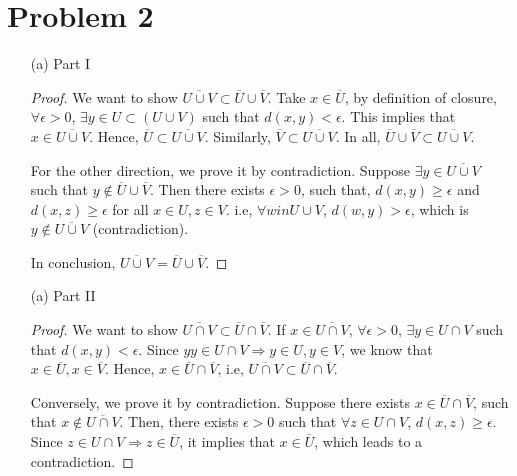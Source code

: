 \documentclass[12pt]{article}
\begin{document}
\section*{Problem 2}

\begin{enumerate}
\item [(a) Part I]

\begin{proof}

We want to show $\overline{U\cup V} \subset \overline U \cup \overline V$. Take $x \in \overline U$, by definition of closure, $\forall \epsilon >0$, $\exists y \in U\subset (U\cup V)$ such that  $d(x, y) < \epsilon$. This implies that $x \in \overline{U\cup V}$. Hence, $\overline U \subset \overline{U\cup V}$. Similarly, $\overline V \subset \overline{U\cup V}$. In all, $\overline U \cup \overline V \subset \overline{U\cup V}$.

For the other direction, we prove it by contradiction. Suppose $\exists y \in \overline{U \cup V}$ such that $y \notin \overline U \cup \overline V$. Then there exists $\epsilon > 0$, such that, $d(x, y) \geqslant \epsilon$ and $d(x, z) \geqslant \epsilon$ for all $x\in U, z \in V$. i.e, $\forall w in U\cup V$, $d(w, y) > \epsilon$, which is $y\notin \overline{U \cup V}$ (contradiction).

In conclusion, $\overline{U\cup V} = \overline U \cup \overline V$.

\end{proof}


\item [(a) Part II]

\begin{proof}

We want to show $\overline{U \cap V} \subset \overline U \cap \overline V$. If $x\in \overline{U\cap V}$, $\forall \epsilon > 0$, $\exists y \in U\cap V$ such that $d(x, y) < \epsilon$. Since $y y \in U\cap V \Rightarrow y \in U, y \in V$, we know that $x\in \overline U, x \in\overline V$. Hence, $x\in \overline U \cap \overline V$, i.e, $\overline{U \cap V} \subset \overline U \cap \overline V$.

Conversely, we prove it by contradiction. Suppose there exists $x \in \overline U \cap \overline V$, such that $x \notin \overline {U\cap V}$. Then, there exists $\epsilon > 0$ such that $\forall z \in U\cap V$, $d(x, z)\geqslant \epsilon$. Since $z\in U\cap V \Rightarrow z\in \overline U$, it implies that $x\in \overline U$, which leads to a contradiction.


\end{proof}
\end{enumerate}
\end{document}
